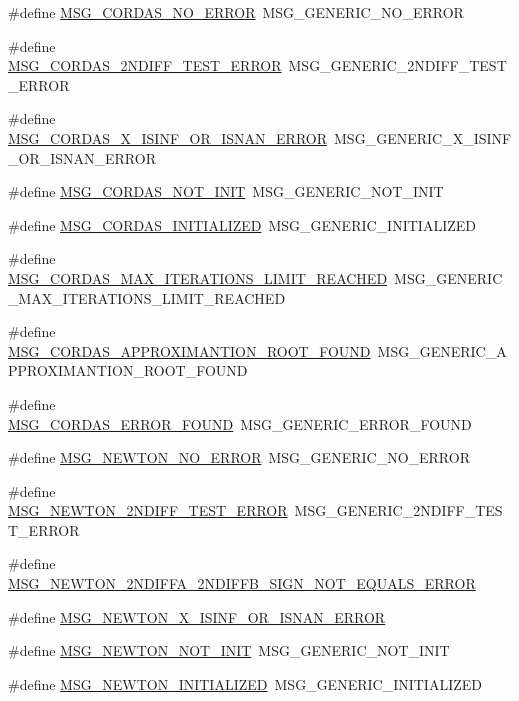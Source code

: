 \begin{CompactItemize}
\item 
\#define \hyperlink{group____messages_ge43ef9f2448a816d8f5a66a10be9ecc6}{MSG\_\-CORDAS\_\-NO\_\-ERROR}~MSG\_\-GENERIC\_\-NO\_\-ERROR
\item 
\#define \hyperlink{group____messages_g5c53fb596fa16a011c11b5f774fc734c}{MSG\_\-CORDAS\_\-2NDIFF\_\-TEST\_\-ERROR}~MSG\_\-GENERIC\_\-2NDIFF\_\-TEST\_\-ERROR
\item 
\#define \hyperlink{group____messages_g3833ee2af65442ebe52a0b8894d0ffba}{MSG\_\-CORDAS\_\-X\_\-ISINF\_\-OR\_\-ISNAN\_\-ERROR}~MSG\_\-GENERIC\_\-X\_\-ISINF\_\-OR\_\-ISNAN\_\-ERROR
\item 
\#define \hyperlink{group____messages_gaad95696ca51302bb4eeda73e504af28}{MSG\_\-CORDAS\_\-NOT\_\-INIT}~MSG\_\-GENERIC\_\-NOT\_\-INIT
\item 
\#define \hyperlink{group____messages_g65513cb1fdadbdf469b3e7ebfd3368fd}{MSG\_\-CORDAS\_\-INITIALIZED}~MSG\_\-GENERIC\_\-INITIALIZED
\item 
\#define \hyperlink{group____messages_gbf2eaacf66da6f1a3ff81d41a6d494ea}{MSG\_\-CORDAS\_\-MAX\_\-ITERATIONS\_\-LIMIT\_\-REACHED}~MSG\_\-GENERIC\_\-MAX\_\-ITERATIONS\_\-LIMIT\_\-REACHED
\item 
\#define \hyperlink{group____messages_g3ec8f3193397bc6bd52fa50ee40e4768}{MSG\_\-CORDAS\_\-APPROXIMANTION\_\-ROOT\_\-FOUND}~MSG\_\-GENERIC\_\-APPROXIMANTION\_\-ROOT\_\-FOUND
\item 
\#define \hyperlink{group____messages_gdceb3235c5e378df5e9204c5bd9802b9}{MSG\_\-CORDAS\_\-ERROR\_\-FOUND}~MSG\_\-GENERIC\_\-ERROR\_\-FOUND
\item 
\#define \hyperlink{group____messages_g40705a83db640354a9ed6bdd2ae0d83b}{MSG\_\-NEWTON\_\-NO\_\-ERROR}~MSG\_\-GENERIC\_\-NO\_\-ERROR
\item 
\#define \hyperlink{group____messages_g7f96c9da7fd5cde69744cd01fc5316a3}{MSG\_\-NEWTON\_\-2NDIFF\_\-TEST\_\-ERROR}~MSG\_\-GENERIC\_\-2NDIFF\_\-TEST\_\-ERROR
\item 
\#define \hyperlink{group____messages_g00fe718729c6efcf4a3bf8187b8f1c9d}{MSG\_\-NEWTON\_\-2NDIFFA\_\-2NDIFFB\_\-SIGN\_\-NOT\_\-EQUALS\_\-ERROR}
\item 
\#define \hyperlink{group____messages_g2e4a5cee2ec2eb38f4849592b3a5c126}{MSG\_\-NEWTON\_\-X\_\-ISINF\_\-OR\_\-ISNAN\_\-ERROR}
\item 
\#define \hyperlink{group____messages_ga1b4ab745166b225744424592a99ac26}{MSG\_\-NEWTON\_\-NOT\_\-INIT}~MSG\_\-GENERIC\_\-NOT\_\-INIT
\item 
\#define \hyperlink{group____messages_ga3c35d88429baed6d9cc86243ea0370c}{MSG\_\-NEWTON\_\-INITIALIZED}~MSG\_\-GENERIC\_\-INITIALIZED

\end{CompactItemize}
